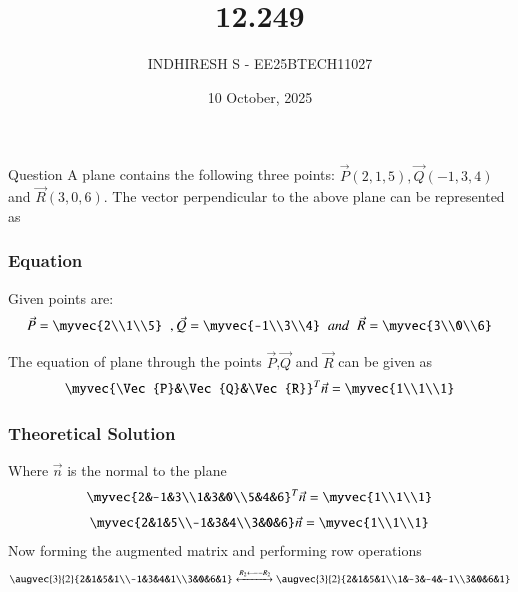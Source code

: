 \documentclass{beamer}
\title %
    {12.249}
\date{10 October, 2025}
\author %
    {INDHIRESH S - EE25BTECH11027}
\begin{document}
    
    \frame{\titlepage}
    
    \begin{frame}{Question}
  A plane contains the following three points: $\Vec{P}(2, 1, 5), \Vec{Q}(-1, 3, 4)$ and $\Vec{R}(3, 0, 6)$. The vector perpendicular to the above plane can be represented as
    \end{frame}
    
    \begin{frame}[allowframebreaks] 
    \frametitle{Equation}
        \centering
        \label{tab:parameters}
Given points are:
\begin{align}
 \Vec{P}=\myvec{2\\1\\5}\;\;,\Vec{Q}=\myvec{-1\\3\\4}\;\;and\;\;\Vec{R}=\myvec{3\\0\\6}
\end{align}

The equation of plane through the points $\Vec{P}$,$\Vec{Q}$ and $\Vec{R}$ can be given as
\begin{align}
\myvec{\Vec{P}&\Vec{Q}&\Vec{R}}^T\Vec{n}=\myvec{1\\1\\1}
\end{align}
    \end{frame}
    
    \begin{frame}
    \frametitle{Theoretical Solution}
   Where $\Vec{n}$ is the normal to the plane
\begin{align}
\myvec{2&-1&3\\1&3&0\\5&4&6}^T \Vec{n}=\myvec{1\\1\\1}
\end{align}
\begin{align}
    \myvec{2&1&5\\-1&3&4\\3&0&6} \Vec{n}=\myvec{1\\1\\1}
\end{align}
Now forming the augmented matrix and performing row operations
\begin{align}
   \augvec{3}{2}{2&1&5&1\\-1&3&4&1\\3&0&6&1}\xleftrightarrow{R_2\longleftarrow -R_2} \augvec{3}{2}{2&1&5&1\\1&-3&-4&-1\\3&0&6&1}
\end{align}






    \end{frame}
    
\end{document}
